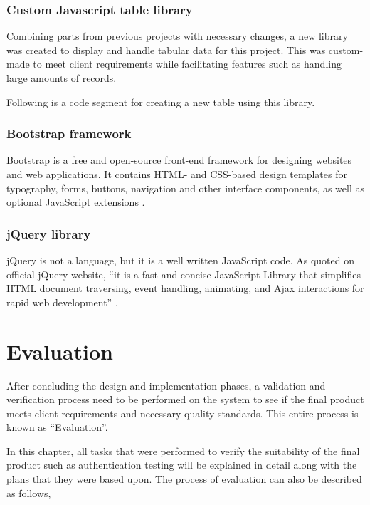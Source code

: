 \documentclass[12pt]{report}
\begin{document}
\subsection{Custom Javascript table library}
Combining parts from previous projects with necessary changes, a new library was created to display and handle tabular data for this project. This was custom-made to meet client requirements while facilitating features such as handling large amounts of records.

\noindent
Following is a code segment for creating a new table using this library.



\subsection{Bootstrap framework}
Bootstrap is a free and open-source front-end framework for designing
websites and web applications. It contains HTML- and CSS-based design templates for typography, forms, buttons, navigation and other interface components, as well as optional JavaScript extensions \cite{chahal_2019_bootstrap}.

\subsection{jQuery library}
jQuery is not a language, but it is a well written JavaScript code. As quoted on
official jQuery website, ``it is a fast and concise JavaScript Library that simplifies HTML document traversing, event handling, animating, and Ajax interactions for rapid web development'' \cite{chaffer_2007_jquery}.

\chapter{Evaluation}
After concluding the design and implementation phases, a validation and verification process need to be performed on the system to see if the final product meets client requirements and necessary quality standards. This entire process is known as ``Evaluation''.

In this chapter, all tasks that were performed to verify the suitability of the final product such as authentication testing will be explained in detail along with the plans that they were based upon. The process of evaluation can also be described as follows,
\end{document}
